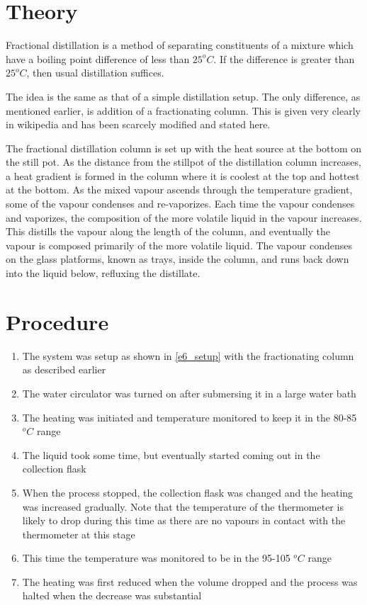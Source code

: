 \section{Theory}
	Fractional distillation is a method of separating constituents of a mixture which have a boiling point difference of less than $25 ^o C$. If the difference is greater than $25 ^o C$, then usual distillation suffices.
	\par
	The idea is the same as that of a simple distillation setup. The only difference, as mentioned earlier, is addition of a fractionating column. This is given very clearly in wikipedia and has been scarcely modified and stated here.
	\par
	The fractional distillation column is set up with the heat source at the bottom on the still pot. As the distance from the stillpot of the distillation column increases, a heat gradient is formed in the column where it is coolest at the top and hottest at the bottom. As the mixed vapour ascends through the temperature gradient, some of the vapour condenses and re-vaporizes. Each time the vapour condenses and vaporizes, the composition of the more volatile liquid in the vapour increases. This distills the vapour along the length of the column, and eventually the vapour is composed primarily of the more volatile liquid. The vapour condenses on the glass platforms, known as trays, inside the column, and runs back down into the liquid below, refluxing the distillate.

\section{Procedure}
	\begin{enumerate}
		\item The system was setup as shown in \autoref{e6_setup} with the fractionating column as described earlier
		\item The water circulator was turned on after submersing it in a large water bath
		\item The heating was initiated and temperature monitored to keep it in the 80-85 $^o C$ range
		\item The liquid took some time, but eventually started coming out in the collection flask
		\item When the process stopped, the collection flask was changed and the heating was increased gradually. Note that the temperature of the thermometer is likely to drop during this time as there are no vapours in contact with the thermometer at this stage
		\item This time the temperature was monitored to be in the 95-105 $^o C$ range
		\item The heating was first reduced when the volume dropped and the process was halted when the decrease was substantial
	\end{enumerate}


